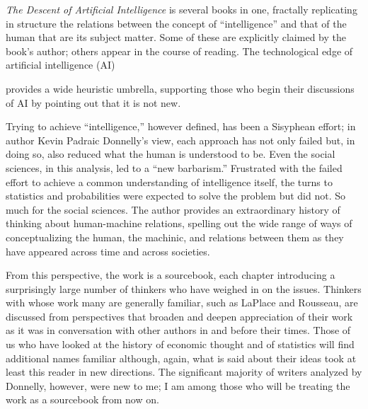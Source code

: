 \documentclass{tufte-handout}
\begin{document}
\begin{titlepage}
\emph{The Descent of Artificial Intelligence} is several books in one,
fractally replicating in structure the relations between the concept of
``intelligence'' and that of the human that are its subject matter. Some
of these are explicitly claimed by the book's author; others appear in
the course of reading. The technological edge of artificial intelligence
(AI)


\enlargethispage{2\baselineskip}

\vspace*{2em}



\end{titlepage}

\noindent provides a wide heuristic umbrella, supporting those who begin
their discussions of AI by pointing out that it is not new.

Trying to achieve ``intelligence,'' however defined, has been a
Sisyphean effort; in author Kevin Padraic Donnelly's view, each approach
has not only failed but, in doing so, also reduced what the human is
understood to be. Even the social sciences, in this analysis, led to a
``new barbarism.'' Frustrated with the failed effort to achieve a common
understanding of intelligence itself, the turns to statistics and
probabilities were expected to solve the problem but did not. So much
for the social sciences. The author provides an extraordinary history of
thinking about human-machine relations, spelling out the wide range of
ways of conceptualizing the human, the machinic, and relations between
them as they have appeared across time and across societies.

From this perspective, the work is a sourcebook, each chapter
introducing a surprisingly large number of thinkers who have weighed in
on the issues. Thinkers with whose work many are generally familiar,
such as LaPlace and Rousseau, are discussed from perspectives that
broaden and deepen appreciation of their work as it was in conversation
with other authors in and before their times. Those of us who have
looked at the history of economic thought and of statistics will find
additional names familiar although, again, what is said about their
ideas took at least this reader in new directions. The significant
majority of writers analyzed by Donnelly, however, were new to me; I am
among those who will be treating the work as a sourcebook from now on.
\end{document}
